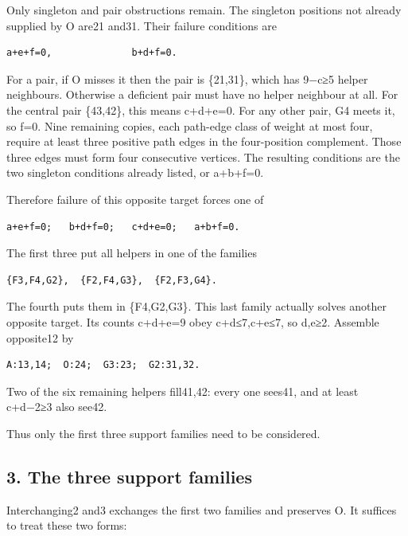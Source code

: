 \documentclass[
  10pt,
]{article}
\begin{document}
Only singleton and pair obstructions remain. The singleton positions not
already supplied by O are21 and31. Their failure conditions are

\begin{verbatim}
a+e+f=0,              b+d+f=0.
\end{verbatim}

For a pair, if O misses it then the pair is \{21,31\}, which has 9−c≥5
helper neighbours. Otherwise a deficient pair must have no helper
neighbour at all. For the central pair \{43,42\}, this means c+d+e=0.
For any other pair, G4 meets it, so f=0. Nine remaining copies, each
path-edge class of weight at most four, require at least three positive
path edges in the four-position complement. Those three edges must form
four consecutive vertices. The resulting conditions are the two
singleton conditions already listed, or a+b+f=0.

Therefore failure of this opposite target forces one of

\begin{verbatim}
a+e+f=0;   b+d+f=0;   c+d+e=0;   a+b+f=0.
\end{verbatim}

The first three put all helpers in one of the families

\begin{verbatim}
{F3,F4,G2},  {F2,F4,G3},  {F2,F3,G4}.
\end{verbatim}

The fourth puts them in \{F4,G2,G3\}. This last family actually solves
another opposite target. Its counts c+d+e=9 obey c+d≤7,c+e≤7, so d,e≥2.
Assemble opposite12 by

\begin{verbatim}
A:13,14;  O:24;  G3:23;  G2:31,32.
\end{verbatim}

Two of the six remaining helpers fill41,42: every one sees41, and at
least c+d−2≥3 also see42.

Thus only the first three support families need to be considered.

\hypertarget{the-three-support-families}{%
\subsection*{3. The three support
families}\label{the-three-support-families}}

Interchanging2 and3 exchanges the first two families and preserves O. It
suffices to treat these two forms:
\end{document}
